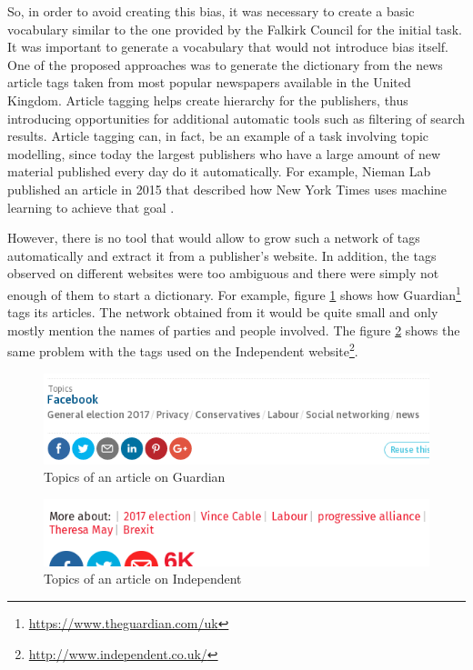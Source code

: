 So, in order to avoid creating this bias, it was necessary to create a basic vocabulary similar to the one provided by the Falkirk Council for the initial task. It was important to generate a vocabulary that would not introduce bias itself. One of the proposed approaches was to generate the dictionary from the news article tags taken from most popular newspapers available in the United Kingdom. Article tagging helps create hierarchy for the publishers, thus introducing opportunities for additional automatic tools such as filtering of search results. Article tagging can, in fact, be an example of a task involving topic modelling, since today the largest publishers who have a large amount of new material published every day do it automatically. For example, Nieman Lab published an article in 2015 that described how New York Times uses machine learning to achieve that goal \cite{niemanlab}.

However, there is no tool that would allow to grow such a network of tags automatically and extract it from a publisher's website. In addition, the tags observed on different websites were too ambiguous and there were simply not enough of them to start a dictionary. For example, figure \ref{fig:guardianTags} shows how Guardian\footnote{\url{https://www.theguardian.com/uk}} tags its articles. The network obtained from it would be quite small and only mostly mention the names of parties and people involved. The figure \ref{fig:indyTags} shows the same problem with the tags used on the Independent website\footnote{\url{http://www.independent.co.uk/}}.

\begin{figure}[ht]
\includegraphics[width=\textwidth]{guardianTags}
\caption{Topics of an article on Guardian}
\label{fig:guardianTags}
\end{figure}

\begin{figure}[ht]
\includegraphics[width=\textwidth]{indyTags}
\caption{Topics of an article on Independent}
\label{fig:indyTags}
\end{figure}

